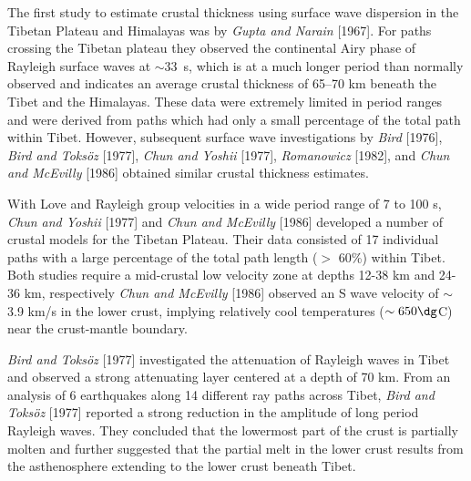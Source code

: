\documentclass[12pt]{article}
\begin{document}
The first study to estimate crustal thickness using surface wave dispersion in the Tibetan Plateau and
Himalayas was by {\it Gupta and Narain} [1967].  For paths crossing the Tibetan
plateau they observed the continental Airy phase of Rayleigh surface
waves at $\sim$33~s, which is at a much longer period than normally
observed and indicates an average crustal thickness of 65--70 km beneath
the Tibet and the Himalayas.  These data were extremely limited in period ranges and were derived from
paths which had only a small percentage of the total path within Tibet. However, subsequent surface wave
investigations by {\it Bird} [1976], {\it Bird and Toks\"oz} [1977], {\it Chun and Yoshii} [1977], {\it
Romanowicz} [1982], and {\it Chun and McEvilly} [1986] obtained similar crustal thickness estimates.

With Love and Rayleigh group velocities in a wide period range of 7 to 100 s, {\it Chun and Yoshii} [1977] and {\it Chun and McEvilly} [1986]
developed a number of crustal models for the Tibetan Plateau.  Their data  consisted of 17 individual paths with a large percentage
of the total path length ($>$ 60\%) within Tibet. Both studies require a
mid-crustal low velocity zone at depths 12-38 km and 24-36 km, respectively
{\it Chun and McEvilly} [1986] observed an S wave velocity of $\sim$ 3.9 km/s in the lower crust, implying
relatively cool temperatures ($\sim 650 \dg$C) near the crust-mantle boundary.

{\it Bird and Toks\"oz} [1977] investigated the attenuation of Rayleigh waves in Tibet and observed a
strong attenuating layer centered at a depth of 70 km.  From an analysis of
  6 earthquakes along 14
different ray paths across Tibet, {\it Bird and Toks\"oz} [1977] reported a strong reduction in the
amplitude of long period Rayleigh waves.  They concluded that the
lowermost part of the crust is partially molten and further suggested that the partial melt in the lower crust
results from the asthenosphere extending to the lower crust beneath Tibet.
\end{document}
